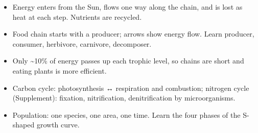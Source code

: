 \documentclass[11pt]{article}
\begin{document}
\begin{itemize}
\item Energy enters from the Sun, flows one way along the chain, and is lost as heat at each step. Nutrients are recycled.

\item Food chain starts with a producer; arrows show energy flow. Learn producer, consumer, herbivore, carnivore, decomposer.

\item Only \textasciitilde{}10\% of energy passes up each trophic level, so chains are short and eating plants is more efficient.

\item Carbon cycle: photosynthesis ↔ respiration and combustion; nitrogen cycle (Supplement): fixation, nitrification, denitrification by microorganisms.

\item Population: one species, one area, one time. Learn the four phases of the S-shaped growth curve.

\end{itemize}
\end{document}
